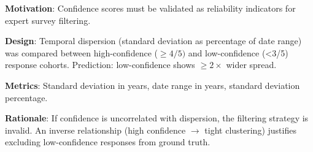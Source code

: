 
\textbf{Motivation}: Confidence scores must be validated as reliability indicators for expert survey filtering.

\textbf{Design}: Temporal dispersion (standard deviation as percentage of date range) was compared between high-confidence ($\geq 4/5)$ and low-confidence (<3/5) response cohorts. Prediction: low-confidence shows $\geq 2\times$ wider spread.

\textbf{Metrics}: Standard deviation in years, date range in years, standard deviation percentage.

\textbf{Rationale}: If confidence is uncorrelated with dispersion, the filtering strategy is invalid. An inverse relationship (high confidence $\rightarrow$ tight clustering) justifies excluding low-confidence responses from ground truth.

